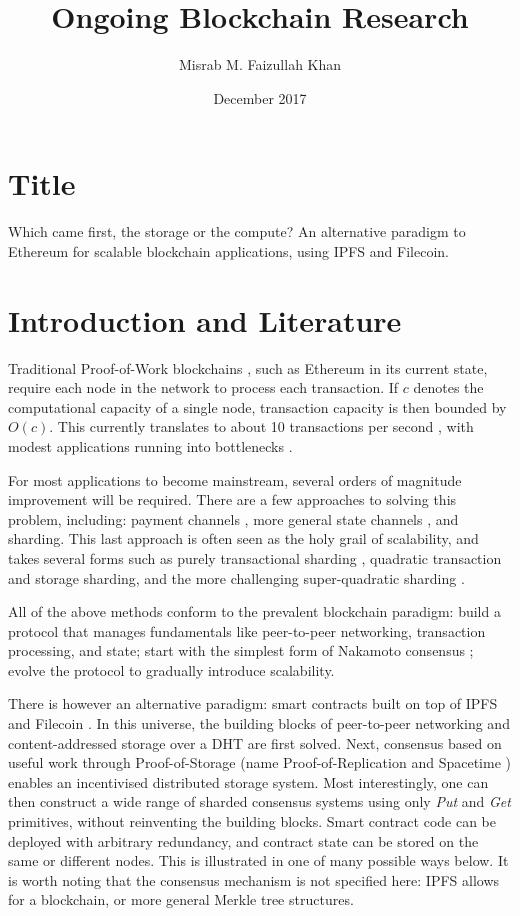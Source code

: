 \documentclass[12pt]{article}
\title{Ongoing Blockchain Research}
\author{Misrab M. Faizullah Khan}
\affil[]{Orion Labs}
\affil[]{\href{mailto:faizullah.misrab@gmail.com}{faizullah.misrab@gmail.com}}
\date{December 2017}
\begin{document}
\maketitle


\section*{Title}

Which came first, the storage or the compute? An alternative paradigm to Ethereum for scalable blockchain applications, using IPFS and Filecoin.

\section*{Introduction and Literature}

Traditional Proof-of-Work blockchains \cite{bitcoin}, such as Ethereum \cite{ethereum} in its current state, require each node in the network to process each transaction. If $c$ denotes the computational capacity of a single node, transaction capacity is then bounded by $O(c)$. This currently translates to about 10 transactions per second \cite{ethereum-tps}, with modest applications running into bottlenecks \cite{cryptokitties}.

For most applications to become mainstream, several orders of magnitude improvement will be required. There are a few approaches to solving this problem, including: payment channels \cite{lightning}, more general state channels \cite{plasma}, and sharding. This last approach is often seen as the holy grail of scalability, and takes several forms such as purely transactional sharding \cite{elastico}, quadratic transaction and storage sharding, and the more challenging super-quadratic sharding \cite{sharding}.

All of the above methods conform to the prevalent blockchain paradigm: build a protocol that manages fundamentals like peer-to-peer networking, transaction processing, and state; start with the simplest form of Nakamoto consensus \cite{nakamoto}; evolve the protocol to gradually introduce scalability.

There is however an alternative paradigm: smart contracts built on top of IPFS \cite{ipfs} and Filecoin \cite{filecoin}. In this universe, the building blocks of peer-to-peer networking and content-addressed storage over a DHT \cite{dht} are first solved. Next, consensus based on useful work through Proof-of-Storage (name Proof-of-Replication and Spacetime \cite{porep}) enables an incentivised distributed storage system. Most interestingly, one can then construct a wide range of sharded consensus systems using only \textit{Put} and \textit{Get} primitives, without reinventing the building blocks. Smart contract code can be deployed with arbitrary redundancy, and contract state can be stored on the same or different nodes. This is illustrated in one of many possible ways below. It is worth noting that the consensus mechanism is not specified here: IPFS allows for a blockchain, or more general Merkle \cite{merkle} tree structures.
\end{document}
